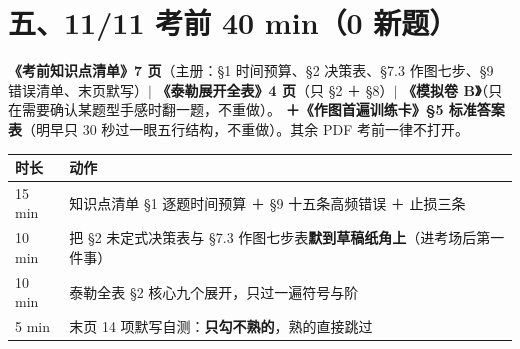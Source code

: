 \documentclass[11pt,a4paper]{ctexart}
\begin{document}
\section{五、11/11 考前 40 min（0 新题）}

\begin{keypoint}[资料收口：只碰 3 本 ＋ 1 张表]
\textbf{《考前知识点清单》7 页}（主册：§1 时间预算、§2 决策表、§7.3 作图七步、§9 错误清单、末页默写）$\mid$
\textbf{《泰勒展开全表》4 页}（只 §2 ＋ §8）$\mid$
\textbf{《模拟卷 B》}（只在需要确认某题型手感时翻一题，不重做）。
\textbf{＋《作图首遍训练卡》§5 标准答案表}（明早只 30 秒过一眼五行结构，不重做）。其余 PDF 考前一律不打开。
\end{keypoint}

\begin{center}\footnotesize
\begin{tabular}{@{}p{1.6cm}p{12.6cm}@{}}
\toprule
\textbf{时长} & \textbf{动作} \\
\midrule
15 min & 知识点清单 §1 逐题时间预算 ＋ §9 十五条高频错误 ＋ 止损三条 \\
10 min & 把 §2 未定式决策表与 §7.3 作图七步表\textbf{默到草稿纸角上}（进考场后第一件事） \\
10 min & 泰勒全表 §2 核心九个展开，只过一遍符号与阶 \\
5 min & 末页 14 项默写自测：\textbf{只勾不熟的}，熟的直接跳过 \\
\bottomrule
\end{tabular}
\end{center}


\vspace{8pt}
\end{document}
